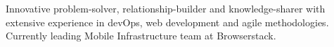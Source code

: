 

\begin{cvparagraph}

Innovative problem-solver, relationship-builder and knowledge-sharer with extensive experience in devOps, web development and agile methodologies. Currently leading Mobile Infrastructure team at Browserstack.





\end{cvparagraph}
